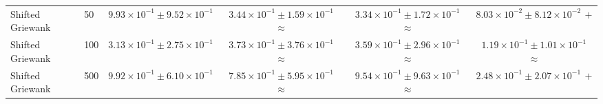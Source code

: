 \begin{table}[t]
\begin{tabular}{llcccc}
Shifted Griewank & 50 & $9.93\times10^{-1}\pm9.52\times10^{-1}$ & $3.44\times10^{-1}\pm1.59\times10^{-1}$ $\approx$ & $3.34\times10^{-1}\pm1.72\times10^{-1}$ $\approx$ & \textbf{$8.03\times10^{-2}\pm8.12\times10^{-2}$ $+$} \\
Shifted Griewank & 100 & $3.13\times10^{-1}\pm2.75\times10^{-1}$ & $3.73\times10^{-1}\pm3.76\times10^{-1}$ $\approx$ & $3.59\times10^{-1}\pm2.96\times10^{-1}$ $\approx$ & \textbf{$1.19\times10^{-1}\pm1.01\times10^{-1}$ $\approx$} \\
Shifted Griewank & 500 & $9.92\times10^{-1}\pm6.10\times10^{-1}$ & $7.85\times10^{-1}\pm5.95\times10^{-1}$ $\approx$ & $9.54\times10^{-1}\pm9.63\times10^{-1}$ $\approx$ & \textbf{$2.48\times10^{-1}\pm2.07\times10^{-1}$ $+$} \\
\bottomrule
\end{tabular}
\end{table}
